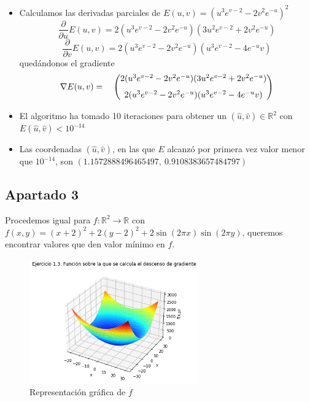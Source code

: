 \documentclass[11pt,a4paper]{article}
\theoremstyle{definition}
\newcommand{\R}{\mathbb{R}}
\begin{document}
	\begin{itemize}
	\item	Calculamos las derivadas parciales de $E(u,v)=(u^3e^{v-2}-2v^2e^{-u})^2$
	$$\frac{\partial}{\partial u} E(u,v)=2(u^3e^{v-2}-2v^2e^{-u})(3u^2e^{v-2}+2v^2e^{-u})$$
	$$\frac{\partial}{\partial v} E(u,v)=2(u^3e^{v-2}-2v^2e^{-u})(u^3e^{v-2}-4e^{-u}v)$$
	quedándonos el gradiente
	$$\nabla E(u,v)=\begin{matrix}
	& \left(\begin{matrix}
	2(u^3e^{v-2}-2v^2e^{-u})(3u^2e^{v-2}+2v^2e^{-u})  \vspace{2.5mm}\\
	2(u^3e^{v-2}-2v^2e^{-u})(u^3e^{v-2}-4e^{-u}v)\\
	\end{matrix}\right)
	\end{matrix}
	$$
	\item El algoritmo ha tomado 10 iteraciones para obtener un $(\hat u,\hat v) \in \R^2$ con $E(\hat u, \hat v) < 10^{-14}$
	\item Las coordenadas $(\hat u, \hat v)$, en las que $E$ alcanzó por primera vez valor menor que $10^{-14}$, son $( 1.1572888496465497 , \ 0.9108383657484797 )$
	\end{itemize}
	\subsection{Apartado 3}
	Procedemos igual para $f\colon \R^2 \to \R$ con $f(x,y)=(x+2)^2+2(y-2)^2+2\sin(2\pi x)\sin(2\pi y)$, queremos encontrar valores que den valor mínimo en $f$.
	
	\begin{figure}[H]
	\centering
	\includegraphics[width=0.65\textwidth]{images/plotF}
	\caption{Representación gráfica de $f$}
	\end{figure}
	
\end{document}
